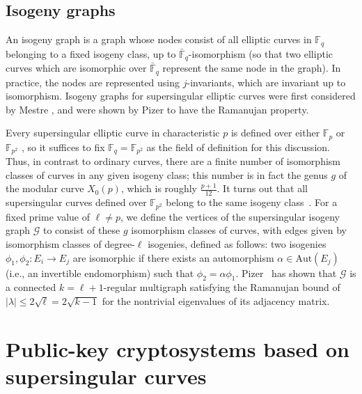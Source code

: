 \documentclass[envcountsect,envcountsame,runningheads]{llncs}   %
\newcommand{\FF}{{\mathbb{F}}}
\begin{document}
{%
\subsection{Isogeny graphs}\label{isog_graph} 

An isogeny graph is a graph whose nodes consist of all elliptic curves
in $\FF_q$ belonging to a fixed isogeny class, up to
$\bar{\FF}_q$-isomorphism (so that two elliptic curves which are
isomorphic over $\bar{\FF}_q$ represent the same node in the
graph). In practice, the nodes are represented using $j$-invariants,
which are invariant up to isomorphism. 
Isogeny graphs for supersingular elliptic curves were first considered
by Mestre \cite{Mestre}, and were shown by Pizer \cite{pizer1,pizer2}
to have the Ramanujan property.

Every supersingular elliptic curve in characteristic $p$ is defined
over either $\FF_p$ or $\FF_{p^2}$ \cite{Sil}, so it suffices to fix
$\FF_q = \FF_{p^2}$ as the field of definition for this
discussion. Thus, in contrast to ordinary curves, there are a finite
number of isomorphism classes of curves in any given isogeny class;
this number is in fact the genus $g$ of the modular curve $X_0(p)$,
which is roughly $\frac{p+1}{12}$. It turns out that all supersingular
curves defined over $\FF_{p^2}$ belong to the same isogeny
class~\cite{Mestre}. For a fixed prime value of $\ell \neq p$, we
define the vertices of the supersingular isogeny graph $\mathcal{G}$
to consist of these $g$ isomorphism classes of curves, with
edges given by isomorphism classes of degree-$\ell$ isogenies,
defined as follows: two isogenies $\phi_1, \phi_2 \colon E_i \to E_j$
are isomorphic if there exists an automorphism $\alpha \in
\text{Aut}(E_j)$ (i.e., an invertible endomorphism) such that $\phi_2
= \alpha\phi_1$. Pizer~\cite{pizer1,pizer2} has shown that
$\mathcal{G}$ is a connected $k = \ell + 1$-regular multigraph
satisfying the Ramanujan bound of $|\lambda| \leq 2\sqrt{\ell} =
2\sqrt{k - 1}$ for the nontrivial eigenvalues of its adjacency matrix.
}

\section{Public-key cryptosystems based on supersingular curves}\label{sec:kep}
\end{document}
